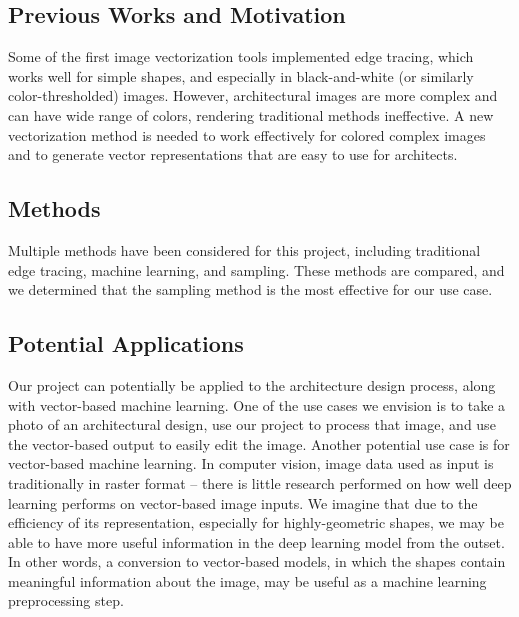 \documentclass{article}
\begin{document}
\subsection{Previous Works and Motivation}

Some of the first image vectorization tools implemented edge tracing, which works well for simple shapes, and especially in black-and-white (or similarly color-thresholded) images. However, architectural images are more complex and can have wide range of colors, rendering traditional methods ineffective. A new vectorization method is needed to work effectively for colored complex images and to generate vector representations that are easy to use for architects. 


\subsection{Methods}

Multiple methods have been considered for this project, including traditional edge tracing, machine learning, and sampling. These methods are compared, and we determined that the sampling method is the most effective for our use case.  

\subsection{Potential Applications}

Our project can potentially be applied to the architecture design process, along with vector-based machine learning. One of the use cases we envision is to take a photo of an architectural design, use our project to process that image, and use the vector-based output to easily edit the image. Another potential use case is for vector-based machine learning. In computer vision, image data used as input is traditionally in raster format -- there is little research performed on how well deep learning performs on vector-based image inputs. We imagine that due to the efficiency of its representation, especially for highly-geometric shapes, we may be able to have more useful information in the deep learning model from the outset. In other words, a conversion to vector-based models, in which the shapes contain meaningful information about the image, may be useful as a machine learning preprocessing step.
\end{document}
